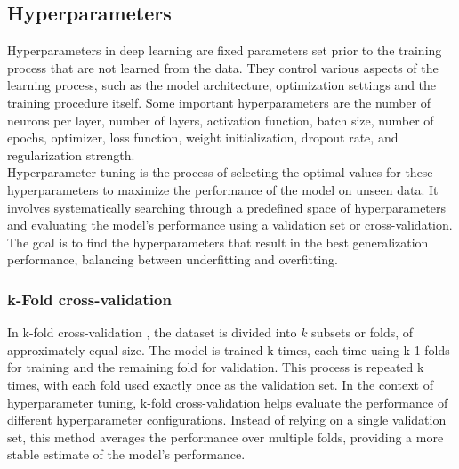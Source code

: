 \subsection{Hyperparameters}\label{section:hyperparameters}
Hyperparameters in deep learning are fixed parameters set prior to the training process that are not learned from the data. They control various aspects of the learning process, such as the model architecture, optimization settings and the training procedure itself. Some important hyperparameters are the number of neurons per layer, number of layers, activation function, batch size, number of epochs, optimizer, loss function, weight initialization, dropout rate, and regularization strength. \\
Hyperparameter tuning is the process of selecting the optimal values for these hyperparameters to maximize the performance of the model on unseen data. It involves systematically searching through a predefined space of hyperparameters and evaluating the model's performance using a validation set or cross-validation. The goal is to find the hyperparameters that result in the best generalization performance, balancing between underfitting and overfitting.
\subsubsection{k-Fold cross-validation}
In k-fold cross-validation \cite{cv}, the dataset is divided into $k$ subsets or folds, of approximately equal size. The model is trained k times, each time using k-1 folds for training and the remaining fold for validation. This process is repeated k times, with each fold used exactly once as the validation set. In the context of hyperparameter tuning, k-fold cross-validation helps evaluate the performance of different hyperparameter configurations. Instead of relying on a single validation set, this method averages the performance over multiple folds, providing a more stable estimate of the model's performance.
